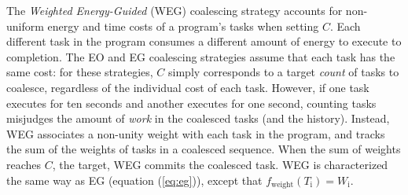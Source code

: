The \emph{Weighted Energy-Guided} (WEG) coalescing strategy accounts for non-uniform energy and time costs of a program's tasks when setting $C$. Each different task in the program consumes a different amount of energy to execute to completion. The EO and EG coalescing strategies assume that each task has the same cost: for these strategies, $C$ simply corresponds to a target {\em count} of tasks to coalesce, regardless of the individual cost of each task. However, if one task executes for ten seconds and another executes for one second, counting tasks misjudges the amount of {\em work} in the coalesced tasks (and the history).
%
Instead, WEG associates a non-unity weight with each task in the program, and tracks the sum of the weights of tasks in a coalesced sequence. When the sum of weights reaches $C$, the target, WEG commits the coalesced task.
WEG is characterized the same way as EG (equation (\ref{eq:eg})), except that $f_\text{weight}(T_\text{i}) = W_\text{i}$.
%
